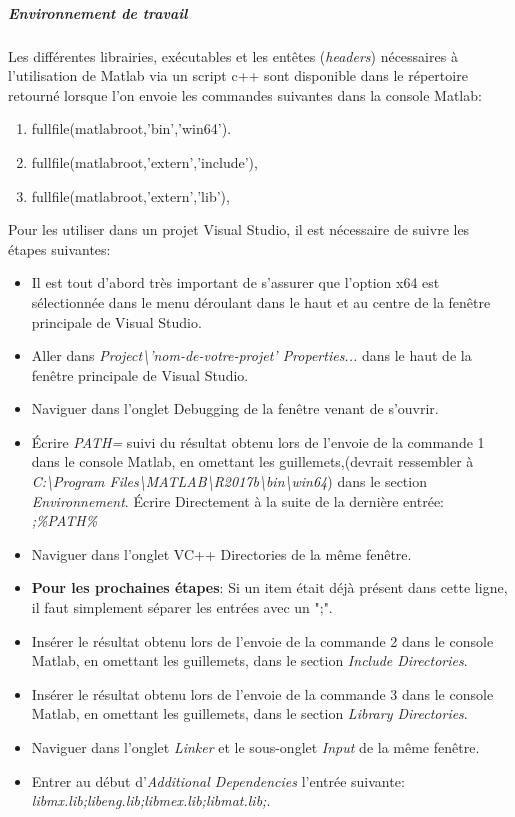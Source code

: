 \subparagraph{Environnement de travail} Les différentes librairies, exécutables et les entêtes (\textit{headers})  nécessaires à l'utilisation de Matlab via un script c++ sont disponible dans le répertoire retourné lorsque l'on envoie les commandes suivantes dans la console Matlab:
\begin{enumerate}
\item fullfile(matlabroot,'bin','win64').
\item fullfile(matlabroot,'extern','include'),
\item fullfile(matlabroot,'extern','lib'),
\end{enumerate}

Pour les utiliser dans un projet Visual Studio, il est nécessaire de suivre les étapes suivantes:
\begin{itemize}
\item Il est tout d'abord très important de s'assurer que l'option x64 est sélectionnée dans le menu déroulant dans le haut et au centre de la fenêtre principale de Visual Studio.
\item Aller dans \textit{Project\textbackslash'nom-de-votre-projet' Properties...} dans le haut de la fenêtre principale de Visual Studio.
\item Naviguer dans l'onglet Debugging de la fenêtre venant de s'ouvrir.
\item Écrire \textit{PATH=} suivi du résultat obtenu lors de l'envoie de la commande 1 dans le console Matlab, en omettant les guillemets,(devrait ressembler à \newline \textit{C:\textbackslash Program Files\textbackslash MATLAB\textbackslash R2017b\textbackslash bin\textbackslash win64}) dans le section \textit{Environnement}.
Écrire Directement à la suite de la dernière entrée: \textit{;\%PATH\%}
\item Naviguer dans l'onglet VC++ Directories de la même fenêtre.
\item \textbf{Pour les prochaines étapes}: Si un item était déjà présent dans cette ligne, il faut simplement séparer les entrées avec un ";".
\item Insérer le résultat obtenu lors de l'envoie de la commande 2 dans le console Matlab, en omettant les guillemets, dans le section \textit{Include Directories}.
\item Insérer le résultat obtenu lors de l'envoie de la commande 3 dans le console Matlab, en omettant les guillemets, dans le section \textit{Library Directories}.
\item Naviguer dans l'onglet \textit{Linker} et le sous-onglet \textit{Input} de la même fenêtre.
\item Entrer au début d'\textit{Additional Dependencies} l'entrée suivante: \textit{libmx.lib;libeng.lib;libmex.lib;libmat.lib;}.
\end{itemize}

